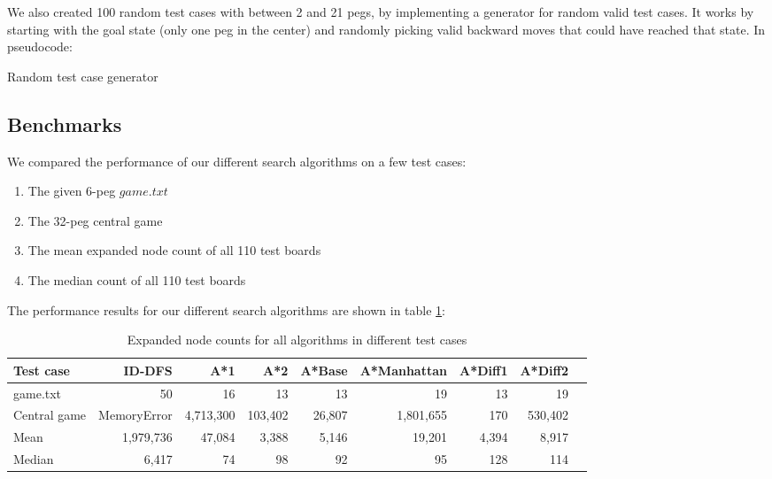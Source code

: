 \documentclass[11pt]{article}
\begin{document}
We also created 100 random test cases with between 2 and 21 pegs, by
implementing a generator for random valid test cases. It works by starting
with the goal state (only one peg in the center) and randomly picking valid
backward moves that could have reached that state. In pseudocode:

\begin{algorithm}
\caption{Random test case generator}
\label{random_alg}
\begin{algorithmic}[1]
	\EndFor
	\State {}
\end{algorithmic}
\end{algorithm}

\subsection{Benchmarks}

We compared the performance of our different search algorithms on a few test cases:

\begin{enumerate}
\item The given 6-peg \(game.txt\)
\item The 32-peg central game
\item The mean expanded node count of all 110 test boards
\item The median count of all 110 test boards
\end{enumerate}

The performance results for our different search algorithms are shown in table \ref{tab_perf}:

\begin{table}[h!]
\centering
\begin{tabular}{| l | r | r | r | r | r | r | r | r |}
\hline
\textbf{Test case} & \textbf{ID-DFS} & \textbf{A*1} & \textbf{A*2} & \textbf{A*Base} &
	\textbf{A*Manhattan} & \textbf{A*Diff1} & \textbf{A*Diff2} \\
\hline
game.txt & 50 & 16 & 13 & 13 & 19 & 13 & 19 \\
\hline
Central game & MemoryError & 4,713,300 & 103,402 & 26,807 & 1,801,655 & 170 & 530,402 \\
\hline
Mean & 1,979,736 & 47,084 & 3,388 & 5,146 & 19,201 & 4,394 & 8,917 \\
\hline
Median & 6,417 & 74 & 98 & 92 & 95 & 128 & 114 \\
\hline
\end{tabular}
\caption{Expanded node counts for all algorithms in different test cases}
\label{tab_perf}
\end{table}
\end{document}

